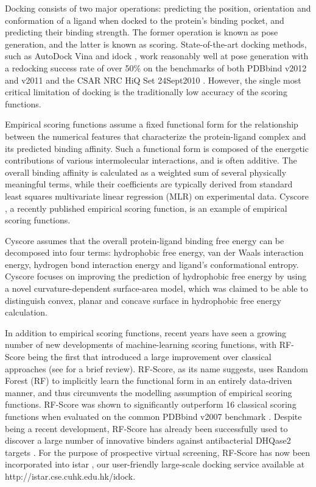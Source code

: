 \documentclass[journal=jacsat,manuscript=article]{achemso}
\begin{document}
Docking consists of two major operations: predicting the position, orientation and conformation of a ligand when docked to the protein's binding pocket, and predicting their binding strength. The former operation is known as pose generation, and the latter is known as scoring. State-of-the-art docking methods, such as AutoDock Vina \cite{595} and idock \cite{1153}, work reasonably well at pose generation with a redocking success rate of over 50\% \cite{1362} on the benchmarks of both PDBbind v2012 and v2011 \cite{529,530} and the CSAR NRC HiQ Set 24Sept2010 \cite{857,960}. However, the single most critical limitation of docking is the traditionally low accuracy of the scoring functions.

Empirical scoring functions assume a fixed functional form for the relationship between the numerical features that characterize the protein-ligand complex and its predicted binding affinity. Such a functional form is composed of the energetic contributions of various intermolecular interactions, and is often additive. The overall binding affinity is calculated as a weighted sum of several physically meaningful terms, while their coefficients are typically derived from standard least squares multivariate linear regression (MLR) on experimental data. Cyscore \cite{1372}, a recently published empirical scoring function, is an example of empirical scoring functions.

Cyscore assumes that the overall protein-ligand binding free energy can be decomposed into four terms: hydrophobic free energy, van der Waals interaction energy, hydrogen bond interaction energy and ligand's conformational entropy. Cyscore focuses on improving the prediction of hydrophobic free energy by using a novel curvature-dependent surface-area model, which was claimed to be able to distinguish convex, planar and concave surface in hydrophobic free energy calculation.

In addition to empirical scoring functions, recent years have seen a growing number of new developments of machine-learning scoring functions, with RF-Score \cite{564} being the first that introduced a large improvement over classical approaches (see \cite{1373} for a brief review). RF-Score, as its name suggests, uses Random Forest (RF) \cite{1309} to implicitly learn the functional form in an entirely data-driven manner, and thus circumvents the modelling assumption of empirical scoring functions. RF-Score was shown to significantly outperform 16 classical scoring functions when evaluated on the common PDBbind v2007 benchmark \cite{564}. Despite being a recent development, RF-Score has already been successfully used to discover a large number of innovative binders against antibacterial DHQase2 targets \cite{1281}. For the purpose of prospective virtual screening, RF-Score has now been incorporated into istar \cite{1362}, our user-friendly large-scale docking service available at http://istar.cse.cuhk.edu.hk/idock.
\end{document}
